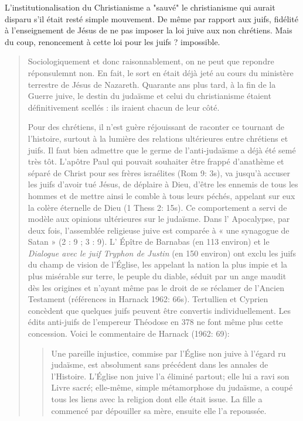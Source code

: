 L'institutionalisation du Christianisme a "sauvé" le christianisme qui aurait disparu s'il était resté simple mouvement.
De même par rapport aux juifs, fidélité à l'enseignement de Jésus de ne pas imposer la loi juive aux non chrétiens. Mais du coup, renoncement à cette loi pour les juifs ? impossible.

\begin{quote}
Sociologiquement et donc raisonnablement, on ne  peut que repondre réponsulemnt non. En fait, le sort en était déjà jeté au cours du
    ministère terrestre de Jésus de Nazareth. Quarante ans plus tard, à la fin
de la Guerre juive, le destin du judaïsme et celui du christianisme
étaient définitivement scellés : ils iraient chacun de leur côté.


Pour des chrétiens, il n'est guère réjouissant de raconter ce tournant
de l'histoire, surtout à la lumière des relations ultérieures entre
chrétiens et juifs. Il faut bien admettre que le germe de l'anti-judaïsme
a déjà été semé très tôt. L'apôtre Paul qui pouvait souhaiter être frappé
d'anathème et séparé de Christ pour ses frères israélites (Rom 9: 3s),
va jusqu'à accuser les juifs d'avoir tué Jésus, de déplaire à Dieu, d'être
les ennemis de tous les hommes et de mettre ainsi le comble à tous
leurs péchés, appelant sur eux la colère éternelle de Dieu (1 Thess
2: 15s). Ce comportement a servi de modèle aux opinions ultérieures
sur le judaïsme. Dans l' Apocalypse, par deux fois, l'assemblée
religieuse juive est comparée à « une synagogue de Satan » (2 : 9 ;
3 : 9). L' Épître de Barnabas (en 113 environ) et le \textit{Dialogue avec le
juif Tryphon de Justin} (en 150 environ) ont exclu les juifs du champ
de vision de l'Église, les appelant la nation la plus impie et la plus
misérable sur terre, le peuple du diable, séduit par un ange maudit dès
les origines et n'ayant même pas le droit de se réclamer de l'Ancien
Testament (références in Harnack 1962: 66s). Tertullien et Cyprien
concèdent que quelques juifs peuvent être convertis individuellement.
Les édits anti-juifs de l'empereur Théodose en 378 ne font même plus
cette concession. Voici le commentaire de Harnack (1962: 69):
\begin{quote}
Une pareille injustice, commise par l'Église non juive à l'égard ru
judaïsme, est absolument sans précédent dans les annales de l'Histoire.
L'Église non juive l'a éliminé partout; elle lui a ravi son Livre sacré;
elle-même, simple métamorphose du judaïsme, a coupé tous les liens avec
la religion dont elle était issue. La fille a commencé par dépouiller sa
mère, ensuite elle l'a repoussée.
\end{quote}


\end{quote}
